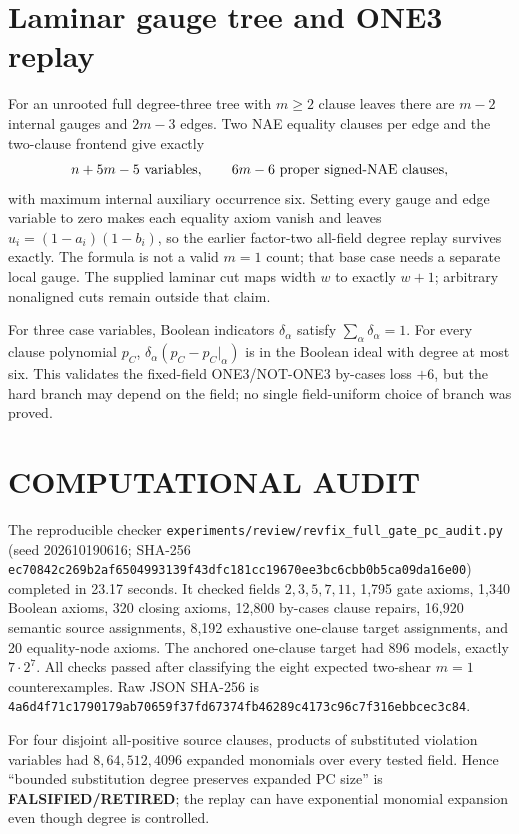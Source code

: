 \documentclass[11pt]{article}
\newcommand{\status}[1]{\textbf{#1}}
\begin{document}
\section*{Laminar gauge tree and ONE3 replay}
For an unrooted full degree-three tree with $m\geq2$ clause leaves there are $m-2$ internal gauges and $2m-3$ edges.  Two NAE equality clauses per edge and the two-clause frontend give exactly
\[
n+5m-5\ \hbox{variables},\qquad 6m-6\ \hbox{proper signed-NAE clauses},
\]
with maximum internal auxiliary occurrence six.  Setting every gauge and edge variable to zero makes each equality axiom vanish and leaves $u_i=(1-a_i)(1-b_i)$, so the earlier factor-two all-field degree replay survives exactly.  The formula is not a valid $m=1$ count; that base case needs a separate local gauge.  The supplied laminar cut maps width $w$ to exactly $w+1$; arbitrary nonaligned cuts remain outside that claim.

For three case variables, Boolean indicators $\delta_\alpha$ satisfy $\sum_\alpha\delta_\alpha=1$.  For every clause polynomial $p_C$, $\delta_\alpha(p_C-p_C|_\alpha)$ is in the Boolean ideal with degree at most six.  This validates the fixed-field ONE3/NOT-ONE3 by-cases loss $+6$, but the hard branch may depend on the field; no single field-uniform choice of branch was proved.

\section*{COMPUTATIONAL AUDIT}
The reproducible checker \texttt{experiments/review/revfix\_full\_gate\_pc\_audit.py} (seed 202610190616; SHA-256 \texttt{ec70842c269b2af6504993139f43dfc181cc19670ee3bc6cbb0b5ca09da16e00}) completed in 23.17 seconds.  It checked fields $2,3,5,7,11$, 1,795 gate axioms, 1,340 Boolean axioms, 320 closing axioms, 12,800 by-cases clause repairs, 16,920 semantic source assignments, 8,192 exhaustive one-clause target assignments, and 20 equality-node axioms.  The anchored one-clause target had 896 models, exactly $7\cdot2^7$.  All checks passed after classifying the eight expected two-shear $m=1$ counterexamples.  Raw JSON SHA-256 is \texttt{4a6d4f71c1790179ab70659f37fd67374fb46289c4173c96c7f316ebbcec3c84}.

For four disjoint all-positive source clauses, products of substituted violation variables had $8,64,512,4096$ expanded monomials over every tested field.  Hence ``bounded substitution degree preserves expanded PC size'' is \status{FALSIFIED/RETIRED}; the replay can have exponential monomial expansion even though degree is controlled.
\end{document}
